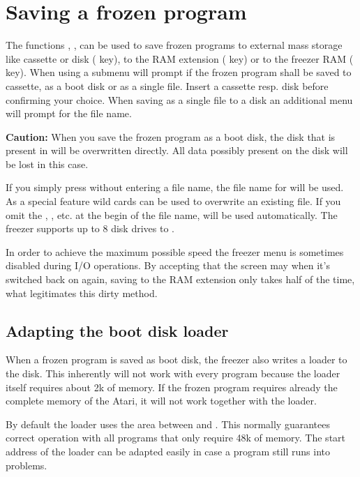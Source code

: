 \section{Saving a frozen program}

The functions , ,  can be used to save frozen programs
to external mass storage like cassette or disk ( key), to the RAM
extension ( key) or to the freezer RAM ( key). When using
 a submenu will prompt if the frozen program shall be saved to
cassette, as a boot disk or as a single file. Insert a cassette resp. disk
before confirming your choice. When saving as a single file to a disk an
additional menu will prompt for the file name.\newline

\textbf{Caution:} When you save the frozen program as a boot disk, the disk that
is present in  will be overwritten directly. All data possibly present
on the disk will be lost in this case.\newline

If you simply press  without entering a file name, the file name
 for  will be used. As a special feature wild cards can
be used to overwrite an existing file. If you omit the , ,
 etc. at the begin of the file name,  will be used
automatically. The freezer supports up to 8 disk drives  to .

In order to achieve the maximum possible speed the freezer menu is
sometimes disabled during I/O operations. By accepting that the screen may
 when it's switched back on again, saving to the RAM extension only
takes half of the time, what legitimates this dirty method.

\subsection{Adapting the boot disk loader}
\label{sec:bootloader}
When a frozen program is saved as boot disk, the freezer also writes a loader to
the disk. This inherently will not work with every program because the loader
itself requires about 2k of memory. If the frozen program requires already the
complete memory of the Atari, it will not work together with the loader.

By default the loader uses the area between  and . This
normally guarantees correct operation with all programs that only require 48k
of memory. The start address of the loader can be adapted easily in case a
program still runs into problems.

